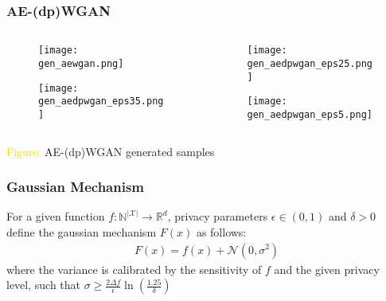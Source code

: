 \begin{frame}
    \frametitle{AE-(dp)WGAN}

    \begin{columns}
        \begin{column}{0.48\textwidth}
        \begin{figure}
            \centering
            \texttt{[image: gen\_aewgan.png]}
        \end{figure}
        \begin{figure}[h]
            \centering
            \texttt{[image: gen\_aedpwgan\_eps35.png]}
        \end{figure}
    \end{column}
    \begin{column}{0.48\textwidth}
        \begin{figure}
            \centering
            \texttt{[image: gen\_aedpwgan\_eps25.png]}
        \end{figure}
        \begin{figure}[h]
            \centering
            \texttt{[image: gen\_aedpwgan\_eps5.png]}
        \end{figure}
    \end{column}
    
    \end{columns}
    \centering
    \textcolor{gold}{Figure:} AE-(dp)WGAN generated samples

\end{frame}
\begin{frame}
    \frametitle{Gaussian Mechanism}

    For a given function  $f:\mathbb{N}^{|\mathcal{X}|} \longrightarrow \mathbb{R}^d$, privacy parameters $\epsilon \in (0,1)$ and $\delta>0$ define the gaussian mechanism $F(x)$ as follows:
    \begin{align}
        F(x) = f(x) + \mathcal{N}(0, \sigma^2)
    \end{align}
    where the variance is calibrated by the sensitivity of $f$ and the given privacy level, such that $\sigma \ge \frac{2 \Delta f}{\epsilon}\ln(\frac{1.25}{\delta})$


\end{frame}


